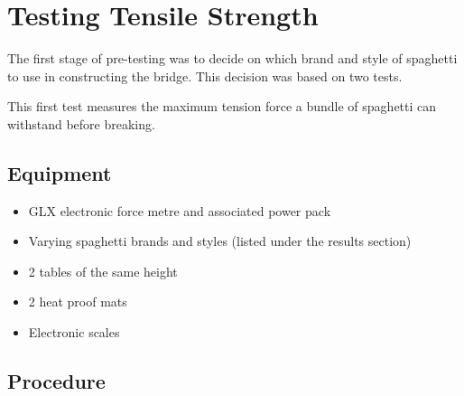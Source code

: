 \documentclass[a4paper,11pt]{article}
\begin{document}
\section{Testing Tensile Strength}

The first stage of pre-testing was to decide on which brand and style of
spaghetti to use in constructing the bridge.
This decision was based on two tests.

This first test measures the maximum tension force a bundle of spaghetti can
withstand before breaking.


\subsection{Equipment}

\begin{itemize}
\item GLX electronic force metre and associated power pack
\item Varying spaghetti brands and styles (listed under the results section)
\item 2 tables of the same height
\item 2 heat proof mats
\item Electronic scales
\end{itemize}


\subsection{Procedure}
\end{document}
